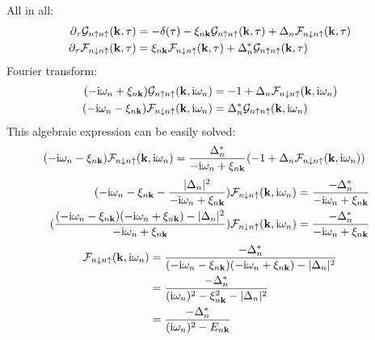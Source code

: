 \documentclass[../main.tex]{subfiles}
\begin{document}
All in all:
\begin{align}
    \pdif{\tau} \mathcal{G}_{n \uparrow n \uparrow} (\vb{k}, \tau) &= -\delta(\tau) - \xi_{n \vb{k}} \mathcal{G}_{n \uparrow n \uparrow} (\vb{k}, \tau) + \Delta_{n} \mathcal{F}_{n\downarrow n\uparrow} (\vb{k}, \tau) \\
    \pdif{\tau} \mathcal{F}_{n \downarrow n \uparrow} (\vb{k}, \tau) &= \xi_{n \vb{k}} \mathcal{F}_{n \downarrow n \uparrow} (\vb{k}, \tau) + \Delta_{n}^* \mathcal{G}_{n\uparrow n\uparrow} (\vb{k}, \tau)
\end{align}
Fourier transform:
\begin{align}
    (-\mathrm{i} \omega_n + \xi_{n \bm{\mathrm{k}}}) \mathcal{G}_{n \uparrow n \uparrow} (\bm{\mathrm{k}}, \mathrm{i} \omega_n) &= -1 + \Delta_{n} \mathcal{F}_{n\downarrow n\uparrow} (\bm{\mathrm{k}}, \mathrm{i} \omega_n) \\
    (-\mathrm{i} \omega_n - \xi_{n \bm{\mathrm{k}}}) \mathcal{F}_{n \downarrow n \uparrow} (\bm{\mathrm{k}}, \mathrm{i} \omega_n) &= \Delta_{n}^* \mathcal{G}_{n\uparrow n\uparrow} (\bm{\mathrm{k}}, \mathrm{i} \omega_n)
\end{align}
This algebraic expression can be easily solved:
\begin{align}
    (-\mathrm{i} \omega_n - \xi_{n \bm{\mathrm{k}}}) \mathcal{F}_{n \downarrow n \uparrow} (\bm{\mathrm{k}}, \mathrm{i} \omega_n) &= \frac{\Delta_{n}^*}{-\mathrm{i} \omega_n + \xi_{n \bm{\mathrm{k}}}} (-1 + \Delta_{n} \mathcal{F}_{n\downarrow n\uparrow} (\bm{\mathrm{k}}, \mathrm{i} \omega_n))
\end{align}
\begin{align}
    (-\mathrm{i} \omega_n - \xi_{n \bm{\mathrm{k}}} - \frac{\vert\Delta_{n}\vert^2}{-\mathrm{i} \omega_n + \xi_{n \bm{\mathrm{k}}}}) \mathcal{F}_{n \downarrow n \uparrow} (\bm{\mathrm{k}}, \mathrm{i} \omega_n) &= \frac{-\Delta_{n}^*}{-\mathrm{i} \omega_n + \xi_{n \bm{\mathrm{k}}}} \\
    (\frac{(-\mathrm{i} \omega_n - \xi_{n \bm{\mathrm{k}}} )(-\mathrm{i} \omega_n + \xi_{n \bm{\mathrm{k}}}) - \vert\Delta_{n}\vert^2}{-\mathrm{i} \omega_n + \xi_{n \bm{\mathrm{k}}}}) \mathcal{F}_{n \downarrow n \uparrow} (\bm{\mathrm{k}}, \mathrm{i} \omega_n) &= \frac{-\Delta_{n}^*}{-\mathrm{i} \omega_n + \xi_{n \bm{\mathrm{k}}}}
\end{align}
\begin{align}
    \mathcal{F}_{n \downarrow n \uparrow} (\bm{\mathrm{k}}, \mathrm{i} \omega_n) &= \frac{-\Delta_{n}^*}{(-\mathrm{i} \omega_n - \xi_{n \bm{\mathrm{k}}} )(-\mathrm{i} \omega_n + \xi_{n \bm{\mathrm{k}}}) - \vert\Delta_{n}\vert^2} \\
    &= \frac{-\Delta_{n}^*}{(\mathrm{i} \omega_n)^2 - \xi_{n \bm{\mathrm{k}}}^2 - \vert\Delta_{n}\vert^2} \\
    &= \frac{-\Delta_{n}^*}{(\mathrm{i} \omega_n)^2 - E_{n \bm{\mathrm{k}}}}
\end{align}
\end{document}
